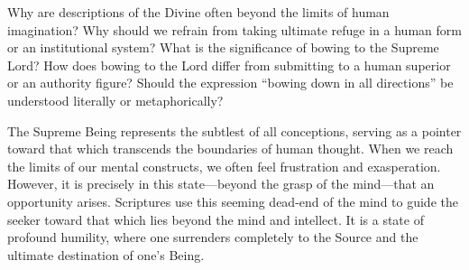 \newpage
\begin{mananam}{}
\normalfont\mananamtext Why are descriptions of the Divine often beyond the limits of human imagination? Why should we refrain from taking ultimate refuge in a human form or an institutional system? What is the significance of bowing to the Supreme Lord? How does bowing to the Lord differ from submitting to a human superior or an authority figure? Should the expression “bowing down in all directions” be understood literally or metaphorically?
\end{mananam}
\sreflect
\begin{inspiration}{}
\normalfont\mananamtext The Supreme Being represents the subtlest of all conceptions, serving as a pointer toward that which transcends the boundaries of human thought. When we reach the limits of our mental constructs, we often feel frustration and exasperation. However, it is precisely in this state—beyond the grasp of the mind—that an opportunity arises. Scriptures use this seeming dead-end of the mind to guide the seeker toward that which lies beyond the mind and intellect. It is a state of profound humility, where one surrenders completely to the Source and the ultimate destination of one’s Being.
\end{inspiration}
\newpage

